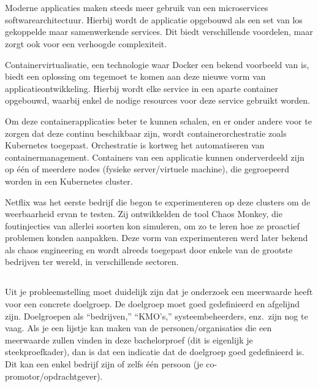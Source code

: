 
\chapter{}
\label{ch:inleiding}

Moderne applicaties maken steeds meer gebruik van een microservices softwarearchitectuur. Hierbij wordt de applicatie opgebouwd als een set van los gekoppelde maar samenwerkende services. Dit biedt verschillende voordelen, maar zorgt ook voor een verhoogde complexiteit. 

Containervirtualisatie, een technologie waar Docker een bekend voorbeeld van is, biedt een oplossing om tegemoet te komen aan deze nieuwe vorm van applicatieontwikkeling. Hierbij wordt elke service in een aparte container opgebouwd, waarbij enkel de nodige resources voor deze service gebruikt worden. 

Om deze containerapplicaties beter te kunnen schalen, en er onder andere voor te zorgen dat deze continu beschikbaar zijn, wordt containerorchestratie zoals Kubernetes toegepast. Orchestratie is kortweg het automatiseren van containermanagement. Containers van een applicatie kunnen onderverdeeld zijn op één of meerdere nodes (fysieke server/virtuele machine), die gegroepeerd worden in een Kubernetes cluster. 

Netflix was het eerste bedrijf die begon te experimenteren op deze clusters om de weerbaarheid ervan te testen. Zij ontwikkelden de tool Chaos Monkey, die foutinjecties van allerlei soorten kon simuleren, om zo te leren hoe ze proactief problemen konden aanpakken. Deze vorm van experimenteren werd later bekend als chaos engineering en wordt alreeds toegepast door enkele van de grootste bedrijven ter wereld, in verschillende sectoren.    

\section{}
\label{sec:probleemstelling}

Uit je probleemstelling moet duidelijk zijn dat je onderzoek een meerwaarde heeft voor een concrete doelgroep. De doelgroep moet goed gedefinieerd en afgelijnd zijn. Doelgroepen als ``bedrijven,'' ``KMO's,'' systeembeheerders, enz.~zijn nog te vaag. Als je een lijstje kan maken van de personen/organisaties die een meerwaarde zullen vinden in deze bachelorproef (dit is eigenlijk je steekproefkader), dan is dat een indicatie dat de doelgroep goed gedefinieerd is. Dit kan een enkel bedrijf zijn of zelfs één persoon (je co-promotor/opdrachtgever).

